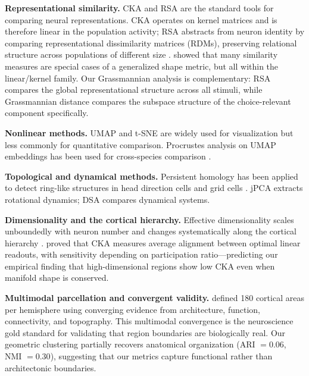 \documentclass{article}
\begin{document}
\textbf{Representational similarity.} CKA \citep{kornblith2019similarity} and RSA \citep{kriegeskorte2008representational} are the standard tools for comparing neural representations. CKA operates on kernel matrices and is therefore linear in the population activity; RSA abstracts from neuron identity by comparing representational dissimilarity matrices (RDMs), preserving relational structure across populations of different size \citep{kriegeskorte2008representational}. \citet{williams2021generalized} showed that many similarity measures are special cases of a generalized shape metric, but all within the linear/kernel family. Our Grassmannian analysis is complementary: RSA compares the global representational structure across all stimuli, while Grassmannian distance compares the subspace structure of the choice-relevant component specifically.

\textbf{Nonlinear methods.} UMAP \citep{mcinnes2018umap} and t-SNE \citep{vandermaaten2008visualizing} are widely used for visualization but less commonly for quantitative comparison. Procrustes analysis on UMAP embeddings has been used for cross-species comparison \citep{deitch2021representational}.

\textbf{Topological and dynamical methods.} Persistent homology has been applied to detect ring-like structures in head direction cells \citep{gardner2022toroidal} and grid cells \citep{rybakken2019decoding}. jPCA \citep{churchland2012neural} extracts rotational dynamics; DSA \citep{ostrow2023beyond} compares dynamical systems.

\textbf{Dimensionality and the cortical hierarchy.} Effective dimensionality scales unboundedly with neuron number \citep{stringer2024unbounded} and changes systematically along the cortical hierarchy \citep{huntenburg2024categorical}. \citet{harvey2024representational} proved that CKA measures average alignment between optimal linear readouts, with sensitivity depending on participation ratio---predicting our empirical finding that high-dimensional regions show low CKA even when manifold shape is conserved.

\textbf{Multimodal parcellation and convergent validity.} \citet{glasser2016multi} defined 180 cortical areas per hemisphere using converging evidence from architecture, function, connectivity, and topography. This multimodal convergence is the neuroscience gold standard for validating that region boundaries are biologically real. Our geometric clustering partially recovers anatomical organization (ARI $= 0.06$, NMI $= 0.30$), suggesting that our metrics capture functional rather than architectonic boundaries.
\end{document}
